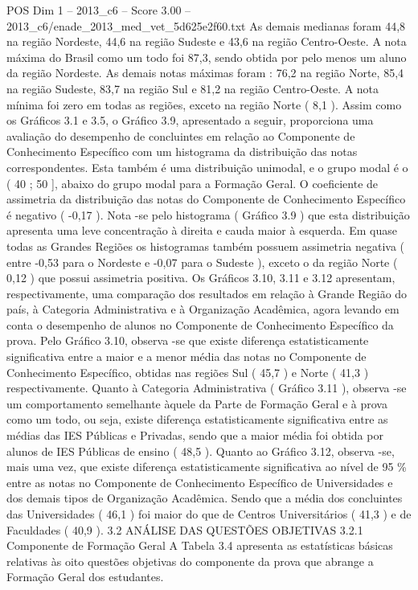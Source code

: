 \begin{textsample}{POS Dim 1 – 2013\_c6 – Score 3.00 – 2013\_c6/enade\_2013\_med\_vet\_5d625e2f60.txt}
As demais medianas foram 44,8 na região Nordeste, 44,6 na região Sudeste e 43,6 na região Centro-Oeste.
A nota máxima do Brasil como um todo foi 87,3, sendo obtida por pelo menos um aluno da região Nordeste.
As demais notas máximas foram : 76,2 na região Norte, 85,4 na região Sudeste, 83,7 na região Sul e 81,2 na região Centro-Oeste.
A nota mínima foi zero em todas as regiões, exceto na região Norte ( 8,1 ).
Assim como os Gráficos 3.1 e 3.5, o Gráfico 3.9, apresentado a seguir, proporciona uma avaliação do desempenho de concluintes em relação ao Componente de Conhecimento Específico com um histograma da distribuição das notas correspondentes.
Esta também é uma distribuição unimodal, e o grupo modal é o ( 40 ; 50 ], abaixo do grupo modal para a Formação Geral.
O coeficiente de assimetria da distribuição das notas do Componente de Conhecimento Específico é negativo ( -0,17 ).
Nota -se pelo histograma ( Gráfico 3.9 ) que esta distribuição apresenta uma leve concentração à direita e cauda maior à esquerda.
Em quase todas as Grandes Regiões os histogramas também possuem assimetria negativa ( entre -0,53 para o Nordeste e -0,07 para o Sudeste ), exceto o da região Norte ( 0,12 ) que possui assimetria positiva.
Os Gráficos 3.10, 3.11 e 3.12 apresentam, respectivamente, uma comparação dos resultados em relação à Grande Região do país, à Categoria Administrativa e à Organização Acadêmica, agora levando em conta o desempenho de alunos no Componente de Conhecimento Específico da prova.
Pelo Gráfico 3.10, observa -se que existe diferença estatisticamente significativa entre a maior e a menor média das notas no Componente de Conhecimento Específico, obtidas nas regiões Sul ( 45,7 ) e Norte ( 41,3 ) respectivamente.
Quanto à Categoria Administrativa ( Gráfico 3.11 ), observa -se um comportamento semelhante àquele da Parte de Formação Geral e à prova como um todo, ou seja, existe diferença estatisticamente significativa entre as médias das IES Públicas e Privadas, sendo que a maior média foi obtida por alunos de IES Públicas de ensino ( 48,5 ).
Quanto ao Gráfico 3.12, observa -se, mais uma vez, que existe diferença estatisticamente significativa ao nível de 95 \% entre as notas no Componente de Conhecimento Específico de Universidades e dos demais tipos de Organização Acadêmica.
Sendo que a média dos concluintes das Universidades ( 46,1 ) foi maior do que de Centros Universitários ( 41,3 ) e de Faculdades ( 40,9 ). 3.2 ANÁLISE DAS QUESTÕES OBJETIVAS 3.2.1 Componente de Formação Geral A Tabela 3.4 apresenta as estatísticas básicas relativas às oito questões objetivas do componente da prova que abrange a Formação Geral dos estudantes.

\end{textsample}
